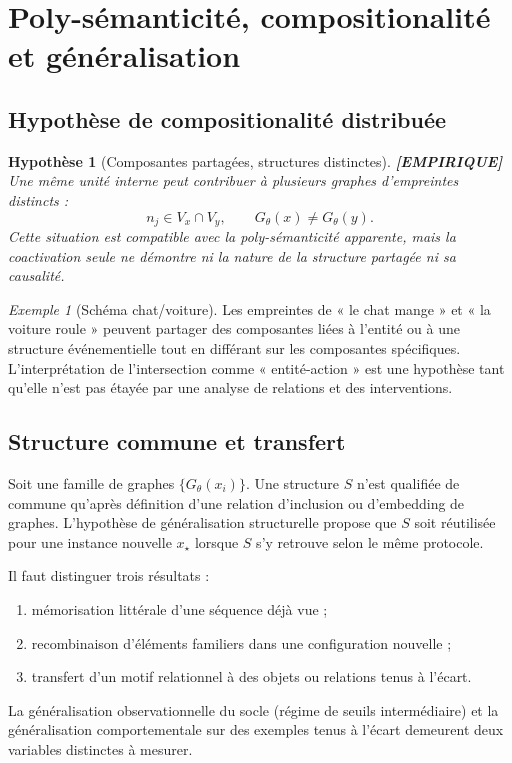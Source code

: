 \documentclass[11pt,a4paper]{article}
\newtheorem{hypothesis}[definition]{Hypothèse}
\theoremstyle{remark}
\newtheorem{example}[definition]{Exemple}
\begin{document}
\section{Poly-sémanticité, compositionalité et généralisation}

\subsection{Hypothèse de compositionalité distribuée}
\begin{hypothesis}[Composantes partagées, structures distinctes] \textbf{[EMPIRIQUE]}
Une même unité interne peut contribuer à plusieurs graphes d'empreintes distincts :
\[
n_j\in V_x\cap V_y,\qquad G_\theta(x)\ne G_\theta(y).
\]
Cette situation est compatible avec la poly-sémanticité apparente, mais la coactivation seule ne démontre ni la nature de la structure partagée ni sa causalité.
\end{hypothesis}

\begin{example}[Schéma chat/voiture]
Les empreintes de « le chat mange » et « la voiture roule » peuvent partager des composantes liées à l'entité ou à une structure événementielle tout en différant sur les composantes spécifiques. L'interprétation de l'intersection comme « entité-action » est une hypothèse tant qu'elle n'est pas étayée par une analyse de relations et des interventions.
\end{example}

\subsection{Structure commune et transfert}
Soit une famille de graphes $\{G_\theta(x_i)\}$. Une structure $S$ n'est qualifiée de commune qu'après définition d'une relation d'inclusion ou d'embedding de graphes. L'hypothèse de généralisation structurelle propose que $S$ soit réutilisée pour une instance nouvelle $x_\star$ lorsque $S$ s'y retrouve selon le même protocole.

Il faut distinguer trois résultats :
\begin{enumerate}[label=\arabic*.]
  \item mémorisation littérale d'une séquence déjà vue ;
  \item recombinaison d'éléments familiers dans une configuration nouvelle ;
  \item transfert d'un motif relationnel à des objets ou relations tenus à l'écart.
\end{enumerate}
La généralisation observationnelle du socle (régime de seuils intermédiaire) et la généralisation comportementale sur des exemples tenus à l'écart demeurent deux variables distinctes à mesurer.
\end{document}

